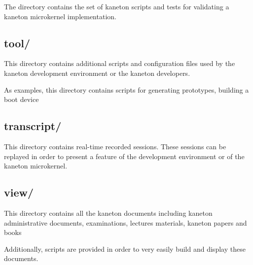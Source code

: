 The  directory contains the set of kaneton scripts and tests
for validating a kaneton microkernel implementation.

%
%

\subsection*{tool/}

This directory contains additional scripts and configuration files used by
the kaneton development environment or the kaneton developers.

As examples, this directory contains scripts for generating prototypes,
building a boot device \etc{}

%
%

\subsection*{transcript/}

This directory contains real-time recorded sessions. These sessions can be
replayed in order to present a feature of the development environment or
of the kaneton microkernel.

%
%

\subsection*{view/}

This directory contains all the kaneton documents including kaneton
administrative documents, examinations, lectures materials, kaneton papers
and books \etc{}

Additionally, scripts are provided in order to very easily build and
display these documents.
